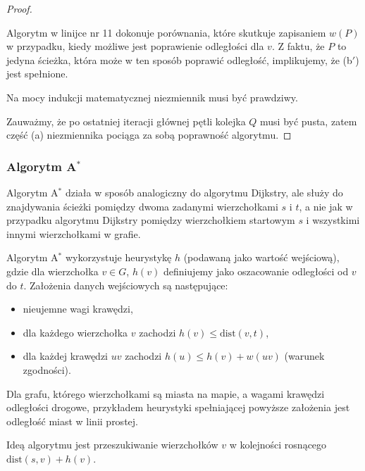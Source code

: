 \begin{theorem}
\begin{proof}
\begin{enumerate}
			Algorytm w linijce nr 11 dokonuje porównania, które 
			skutkuje zapisaniem $w(P)$ w przypadku,
			kiedy możliwe jest poprawienie odległości dla $v$. Z faktu, że
			$P$ to jedyna ścieżka, która może w ten sposób poprawić odległość,
			implikujemy, że (b$'$) jest spełnione.
		\end{enumerate}
		
		
		
		Na mocy indukcji matematycznej niezmiennik musi być prawdziwy.
		
		Zauważmy, że po ostatniej iteracji głównej pętli kolejka $Q$ musi być pusta,
		zatem część (a) niezmiennika pociąga za sobą
		poprawność algorytmu.
	\end{proof}
	\label{dijkstra_proof}
\end{theorem}


\subsubsection{Algorytm A\texorpdfstring{$^*$}{TEXT}}
Algorytm A$^*$ działa w sposób analogiczny do algorytmu Dijkstry, 
ale służy do znajdywania ścieżki pomiędzy dwoma zadanymi wierzchołkami
$s$ i $t$, a nie jak w przypadku algorytmu Dijkstry pomiędzy wierzchołkiem startowym $s$
i wszystkimi innymi wierzchołkami w grafie.

Algorytm A$^*$ wykorzystuje heurystykę $h$ (podawaną jako wartość
wejściową), gdzie dla wierzchołka
$v \in G$, $h(v)$ definiujemy jako oszacowanie
odległości od $v$ do $t$. Założenia danych wejściowych są następujące:
\begin{itemize}[noitemsep, nolistsep]
	\item nieujemne wagi krawędzi,
	\item dla każdego wierzchołka $v$ zachodzi $h(v) \leq \text{dist}(v, t)$,
	\item dla każdej krawędzi $uv$ zachodzi $h(u) \leq h(v) + w(uv)$ (warunek zgodności).
\end{itemize}
Dla grafu, którego wierzchołkami są miasta na mapie, a wagami krawędzi odległości drogowe, przykładem heurystyki spełniającej powyższe założenia jest odległość miast w linii prostej.

 Ideą algorytmu jest przeszukiwanie wierzchołków $v$ w kolejności 
rosnącego $\text{dist}(s,v) + h(v)$. 

